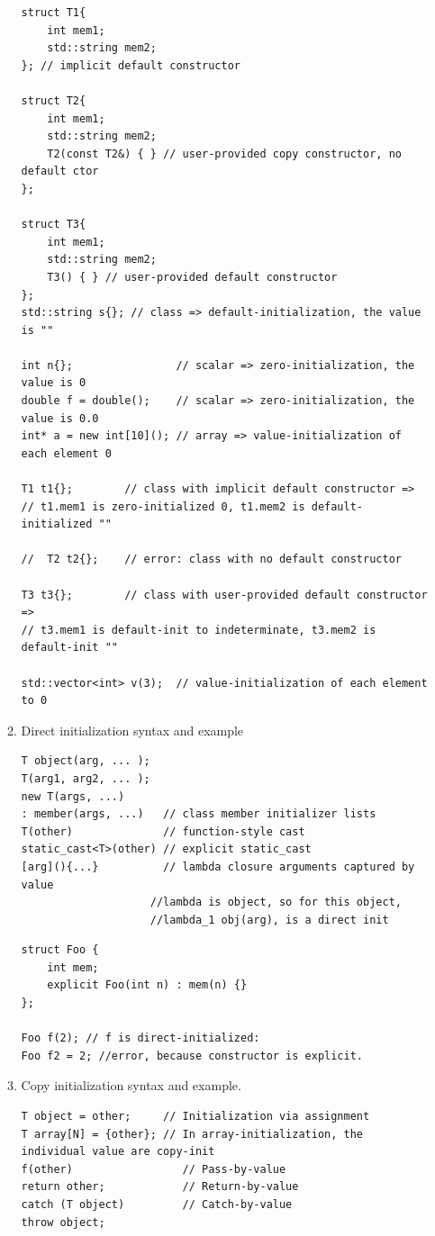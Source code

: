 \documentclass[a4paper,11pt,twoside]{book}
\begin{document}
\begin{itemize}
\begin{enumerate}
\begin{lstlisting}
struct T1{
	int mem1;
	std::string mem2;
}; // implicit default constructor

struct T2{
	int mem1;
	std::string mem2;
	T2(const T2&) { } // user-provided copy constructor, no default ctor
};

struct T3{
	int mem1;
	std::string mem2;
	T3() { } // user-provided default constructor
};
std::string s{}; // class => default-initialization, the value is ""

int n{};                // scalar => zero-initialization, the value is 0
double f = double();    // scalar => zero-initialization, the value is 0.0
int* a = new int[10](); // array => value-initialization of each element 0

T1 t1{};		// class with implicit default constructor =>
// t1.mem1 is zero-initialized 0, t1.mem2 is default-initialized ""

//  T2 t2{};	// error: class with no default constructor

T3 t3{};		// class with user-provided default constructor =>
// t3.mem1 is default-init to indeterminate, t3.mem2 is default-init ""

std::vector<int> v(3);  // value-initialization of each element to 0
\end{lstlisting}


		\item Direct initialization syntax and example
\begin{lstlisting}[numbers=none]
T object(arg, ... );
T(arg1, arg2, ... );
new T(args, ...)
: member(args, ...)   // class member initializer lists
T(other)              // function-style cast
static_cast<T>(other) // explicit static_cast
[arg](){...}          // lambda closure arguments captured by value
					//lambda is object, so for this object, 
					//lambda_1 obj(arg), is a direct init
\end{lstlisting}


\begin{lstlisting}[numbers=none]
struct Foo {
	int mem;
	explicit Foo(int n) : mem(n) {}
};

Foo f(2); // f is direct-initialized:
Foo f2 = 2; //error, because constructor is explicit.
\end{lstlisting}


		\item Copy initialization syntax and example.
\begin{lstlisting}[numbers=none]
T object = other;     // Initialization via assignment
T array[N] = {other}; // In array-initialization, the individual value are copy-init
f(other)                 // Pass-by-value
return other;            // Return-by-value
catch (T object)         // Catch-by-value
throw object;
\end{lstlisting}


\end{enumerate}
\end{itemize}
\end{document}
